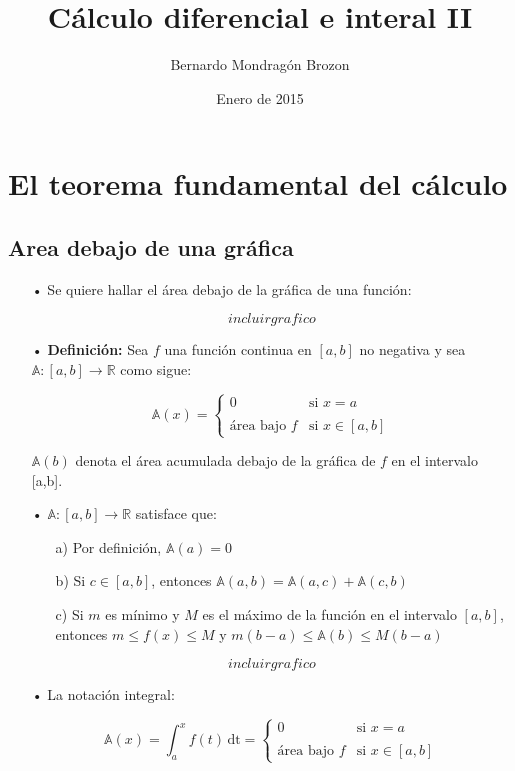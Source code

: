 \documentclass[pts12]{article}
\title{Cálculo diferencial e interal II}
\author{Bernardo Mondragón Brozon}
\date{Enero de 2015}
\numberwithin{equation}{section}
\newcommand{\Col}{\color{ProcessBlue}}
\begin{document}
\maketitle

\section{\Col El teorema fundamental del cálculo}

\subsection{\Col Area debajo de una gráfica}

\begin{itemize}
\item[\Col •] Se quiere hallar el área debajo de la gráfica de una función:

$$ incluir grafico $$

\item[\Col•] \textbf{Definición:} Sea $f$ una función continua en $[a,b]$ no negativa y sea $\mathbb{A}:[a,b]\longrightarrow\mathbb{R}$ como sigue:

$$ \mathbb{A}(x) =
\left\{
 \begin{array}{ll}
  0  & \mbox{si } x=a \\
  \\ \mbox{área bajo $f$} & \mbox{si } x\in [a,b]
 \end{array}
\right.$$
 
$\mathbb{A}(b)$ denota el área acumulada debajo de la gráfica de $f$ en el intervalo [a,b]. 

\item[\Col •] $\mathbb{A}:[a,b]\longrightarrow\mathbb{R}$ satisface que:

\begin{enumerate}
\item[a)] Por definición, $\mathbb{A}(a)=0$
\item[b)] Si $c\in [a,b]$, entonces $\mathbb{A}(a,b)=\mathbb{A}(a,c)+\mathbb{A}(c,b)$
\item[c)] Si $m$ es mínimo y $M$ es el máximo de la función en el intervalo $[a,b]$, entonces $m\leq f(x)\leq M$ y $m(b-a)\leq \mathbb{A}(b)\leq M(b-a)$ 
\end{enumerate} 
 
$$ incluir grafico $$

\item[\Col •] La notación integral: 

$$ \mathbb{A}(x)=\int_{a}^{x} \! {f(t)} \, \mathrm{dt} =
\left\{
 \begin{array}{ll}
  0  & \mbox{si } x=a \\
  \\ \mbox{área bajo $f$} & \mbox{si } x\in [a,b]
 \end{array}
\right.$$

\end{itemize}
\end{document}
